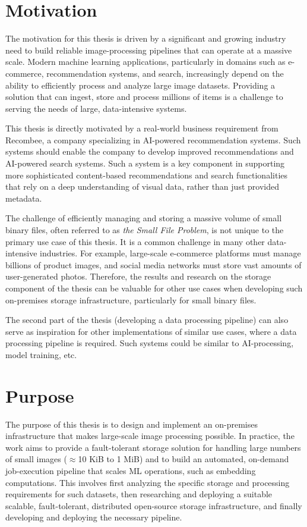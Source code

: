 \section{Motivation} \label{sec:motivation}
The motivation for this thesis is driven by a significant and growing industry need to build reliable image-processing pipelines that can operate at a massive scale. Modern machine learning applications, particularly in domains such as e-commerce, recommendation systems, and search, increasingly depend on the ability to efficiently process and analyze large image datasets. Providing a solution that can ingest, store and process millions of items is a challenge to serving the needs of large, data-intensive systems.

This thesis is directly motivated by a real-world business requirement from Recombee, a company specializing in AI-powered recommendation systems. Such systems should enable the company to develop improved recommendations and AI-powered search systems. Such a system is a key component in supporting more sophisticated content-based recommendations and search functionalities that rely on a deep understanding of visual data, rather than just provided metadata.

The challenge of efficiently managing and storing a massive volume of small binary files, often referred to as \textit{the Small File Problem}, is not unique to the primary use case of this thesis. It is a common challenge in many other data-intensive industries. For example, large-scale e-commerce platforms must manage billions of product images, and social media networks must store vast amounts of user-generated photos. Therefore, the results and research on the storage component of the thesis can be valuable for other use cases when developing such on-premises storage infrastructure, particularly for small binary files.

The second part of the thesis (developing a data processing pipeline) can also serve as inspiration for other implementations of similar use cases, where a data processing pipeline is required. Such systems could be similar to AI-processing, model training, etc.

\section{Purpose} \label{sec:purpose}
The purpose of this thesis is to design and implement an on-premises infrastructure that makes large-scale image processing possible. In practice, the work aims to provide a fault-tolerant storage solution for handling large numbers of small images ($\approx$10 KiB to 1 MiB) and to build an automated, on-demand job-execution pipeline that scales ML operations, such as embedding computations. This involves first analyzing the specific storage and processing requirements for such datasets, then researching and deploying a suitable scalable, fault-tolerant, distributed open-source storage infrastructure, and finally developing and deploying the necessary pipeline.